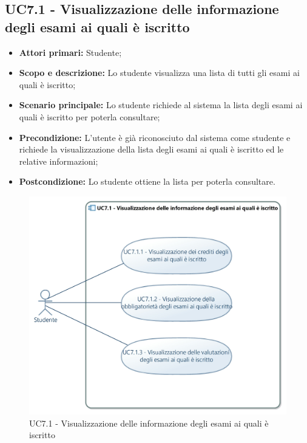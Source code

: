 \documentclass[AnalisiDeiRequisiti.tex]{subfiles}
\begin{document}
\subsection{UC7.1 - Visualizzazione delle informazione degli esami ai quali è iscritto}
\begin{itemize}
	\item \textbf{Attori primari:} Studente;\\
	\item \textbf{Scopo e descrizione:} Lo studente visualizza una lista di tutti gli esami ai quali è iscritto;\\
	\item \textbf{Scenario principale:} Lo studente richiede al sistema la lista degli esami ai quali è iscritto per poterla consultare;\\
	\item \textbf{Precondizione:} L'utente è già riconosciuto dal sistema come studente e richiede la visualizzazione della lista degli esami ai quali è iscritto ed le relative informazioni;\\
	\item \textbf{Postcondizione:} Lo studente ottiene la lista per poterla consultare.\\
\end{itemize}

\begin{figure}[H]
	\centering
	\includegraphics[width=1.0\linewidth]{UC7_1.jpg}
	\caption{UC7.1 - Visualizzazione delle informazione degli esami ai quali è iscritto}
	\label{fig:UC7.1 - Visualizzazione delle informazione degli esami ai quali e' iscritto} %
\end{figure}
\end{document}
